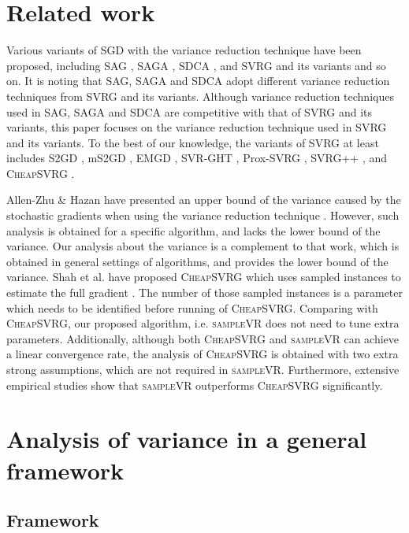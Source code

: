\documentclass[letterpaper]{article}
\begin{document}
\section{Related work}
\label{sect_related_work}
Various variants of  SGD with the variance reduction technique have been proposed, including SAG \cite{Schmidt:2013ui}, SAGA \cite{Defazio:2014vu}, SDCA \cite{ShalevShwartz:2016vy}, and SVRG \cite{Johnson:9MAvkbgy} and its variants and so on. It is noting that SAG, SAGA and SDCA adopt different variance reduction techniques from SVRG and its variants. Although variance reduction techniques used in SAG, SAGA and SDCA are competitive with that of SVRG and its variants,  this paper focuses on the variance reduction technique used in SVRG and its variants. To the best of our knowledge,  the variants of SVRG at least includes S2GD \cite{Richtarik:2013te}, mS2GD \cite{Liu:2015bx}, EMGD \cite{Zhang2013Linear}, SVR-GHT \cite{Li:2016vh}, Prox-SVRG \cite{Xiao:2014vw}, SVRG++ \cite{Allen2015Improved}, and \textsc{CheapSVRG} \cite{Shah2016Trading}. 

Allen-Zhu \& Hazan have presented an upper bound of the variance caused by the stochastic gradients when using the variance reduction technique \cite{AllenZhu:2016up}. However, such analysis is obtained for a specific algorithm, and lacks the lower bound of the variance.    Our analysis about the variance is a complement to that work, which is obtained in general settings of algorithms, and provides  the lower bound of the variance. Shah et al. have proposed \textsc{CheapSVRG} which uses sampled instances to estimate the full gradient \cite{Shah2016Trading}. The number of those sampled instances is a parameter which needs to be identified before running of \textsc{CheapSVRG}. Comparing with \textsc{CheapSVRG}, our proposed algorithm, i.e. \textsc{sampleVR} does not need to tune extra parameters. Additionally, although both \textsc{CheapSVRG} and \textsc{sampleVR} can achieve a linear convergence rate, the analysis of \textsc{CheapSVRG} is obtained with two extra strong assumptions, which are not required in \textsc{sampleVR}. Furthermore, extensive empirical studies show that  \textsc{sampleVR} outperforms \textsc{CheapSVRG} significantly.
 

\section{Analysis of variance in a  general framework}
\label{sect_framework}
\subsection{Framework}
\end{document}
